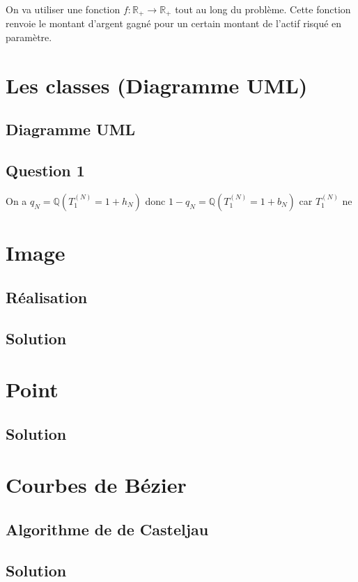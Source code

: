 \documentclass[a4paper, 12pt]{article}
\begin{document}
	On va utiliser une fonction $f:  \mathbb{R}_+ \rightarrow \mathbb{R}_+$ tout au long du problème. Cette fonction renvoie le montant d'argent gagné pour un certain montant de l'actif risqué en paramètre.\\
		
	\newpage

\section{Les classes (Diagramme UML)}			
\subsection{Diagramme UML}
\subsection{Question 1}
On a $q_N=\mathbb{Q}(T_1^{(N)}=1+h_N)$ donc $1-q_N=\mathbb{Q}(T_1^{(N)}=1+b_N)$ car $T_1^{(N)}$ ne 

\section{Image}	
\subsection{Réalisation}
\subsection{Solution}

\section{Point}	
\subsection{Solution}

\section{Courbes de Bézier}	
\subsection{Algorithme de de Casteljau}
\subsection{Solution}
\end{document}
